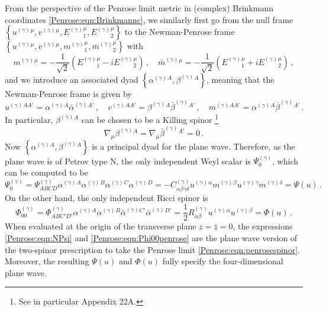 From the perspective of the Penrose limit metric in (complex) Brinkmann coordinates \eqref{Penrose:eqn:Brinkmannc}, we similarly first go from the null frame $\left\lbrace u^{(\gamma)}{}^{\mu}, v^{(\gamma)}{}^{\mu}, E^{(\gamma)}{}^{\mu}_1 , E^{(\gamma)}{}^{\mu}_2 \right \rbrace$ to the Newman-Penrose frame $\left\lbrace u^{(\gamma)}{}^{\mu}, v^{(\gamma)}{}^{\mu}, m^{(\gamma)}{}^{\mu}_1 , \bar{m}^{(\gamma)}{}^{\mu}_2 \right \rbrace$ with
\begin{equation}\label{Penrose:eqn:mdefplanewave}
m^{(\gamma)}{}^{\mu} = -\frac{1}{\sqrt{2}}\left(E^{(\gamma)}{}^{\mu}_1 - i E^{(\gamma)}{}^{\mu}_2 \right) \, , \quad 	\bar{m}^{(\gamma)}{}^{\mu} = -\frac{1}{\sqrt{2}}\left(E^{(\gamma)}{}^{\mu}_1 + i E^{(\gamma)}{}^{\mu}_2 \right) \, ,
\end{equation} 
and we introduce an associated dyad $\left\lbrace \alpha^{(\gamma)}{}^A , \beta^{(\gamma)}{}^A\right\rbrace$, meaning that the Newman-Penrose frame is given by
\begin{equation}\label{Penrose:eqn:NPindyad}
u^{(\gamma)}{}^{AA'} = \alpha^{(\gamma)}{}^A \bar{\alpha}^{(\gamma)}{}^{A'}\, ,  \quad v^{(\gamma)}{}^{AA'} = \beta^{(\gamma)}{}^A \bar{\beta}^{(\gamma)}{}^{A'}\, , \quad m^{(\gamma)}{}^{AA'} =\alpha^{(\gamma)}{}^A \bar{\beta}^{(\gamma)}{}^{A'} \, .
\end{equation}
In particular, $\beta^{(\gamma)}{}^{A}$  can be chosen to be a Killing spinor \cite{Freedman:2012zz}\footnote{See in particular Appendix 22A.}
\begin{equation}
\nabla_{\mu} \beta^{(\gamma)}{}^{A} = \nabla_{\mu} \bar{\beta}^{(\gamma)}{}^{A'}  = 0 \, . 
\end{equation}
Now $\left\lbrace \alpha^{(\gamma)}{}^A , \beta^{(\gamma)}{}^A\right\rbrace$ is a principal dyad for the plane wave. Therefore, as the plane wave is of Petrov type N, the only independent Weyl scalar is $\Psi^{(\gamma)}_0$, which can be computed to be
\begin{equation}\label{Penrose:eqn:NPsi}
\Psi^{(\gamma)}_0 = \Psi^{(\gamma)}_{ABCD}\alpha^{(\gamma)}{}^A \alpha^{(\gamma)}{}^B \alpha^{(\gamma)}{}^C \alpha^{(\gamma)}{}^D = - C^{(\gamma)}_{\alpha \beta \gamma \delta} u^{(\gamma)}{}^{\alpha}  m^{(\gamma)}{}^{\beta} u^{(\gamma)}{}^{\gamma} m^{(\gamma)}{}^{\delta} = \Psi(u) \, .
\end{equation}
On the other hand, the only independent Ricci spinor is
\begin{equation}\label{Penrose:eqn:Phi00penrose}
\Phi^{(\gamma)}_{00} = \Phi^{(\gamma)}_{ABC'D'}\alpha^{(\gamma)}{}^A \alpha^{(\gamma)}{}^B \bar{\alpha}^{(\gamma)}{}^{C'} \bar{\alpha}^{(\gamma)}{}^{D'} = \frac{1}{2}R^{(\gamma)}_{\alpha \beta} u^{(\gamma)}{}^{\alpha} u^{(\gamma)}{}^{\beta} = \Phi(u) \, .
\end{equation}
When evaluated at the origin of the transverse plane $z = \bar{z} = 0$, the expressions \eqref{Penrose:eqn:NPsi} and
\eqref{Penrose:eqn:Phi00penrose} are the plane wave version of the two-spinor prescription to take the Penrose limit \eqref{Penrose:eqn:penrosespinor}. Moreover, the resulting $\Psi(u) $ and $\Phi(u)$ fully specify the four-dimensional plane wave.

